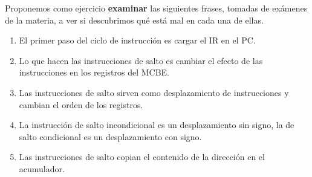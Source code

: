 \documentclass[spanish,A4,]{article}
\begin{document}
Proponemos como ejercicio \textbf{examinar} las siguientes frases,
tomadas de exámenes de la materia, a ver si descubrimos qué está mal en
cada una de ellas.

\begin{enumerate}
\def\labelenumi{\arabic{enumi}.}
\itemsep1pt\parskip0pt
\item
  El primer paso del ciclo de instrucción es cargar el IR en el PC.
\item
  Lo que hacen las instrucciones de salto es cambiar el efecto de las
  instrucciones en los registros del MCBE.
\item
  Las instrucciones de salto sirven como desplazamiento de instrucciones
  y cambian el orden de los registros.
\item
  La instrucción de salto incondicional es un desplazamiento sin signo,
  la de salto condicional es un desplazamiento con signo.
\item
  Las instrucciones de salto copian el contenido de la dirección en el
  acumulador.
\end{enumerate}
\end{document}
